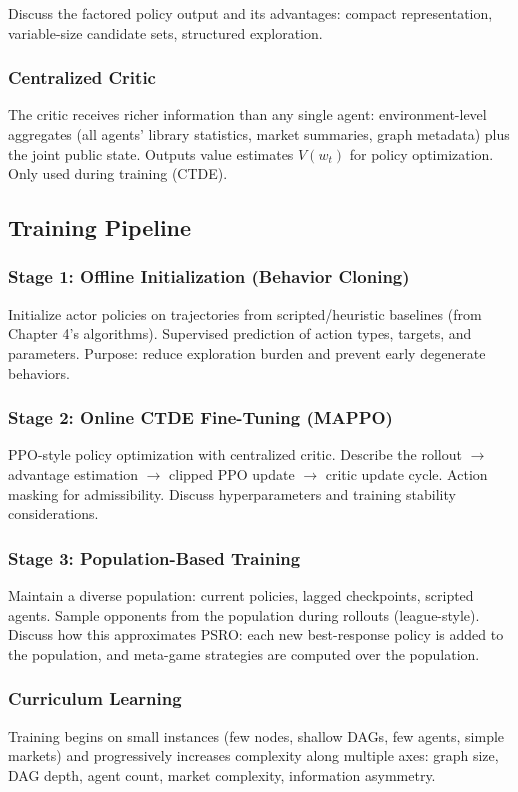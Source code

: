 Discuss the factored policy output and its advantages: compact representation, variable-size candidate sets, structured exploration.

\subsubsection{Centralized Critic}
The critic receives richer information than any single agent: environment-level aggregates (all agents' library statistics, market summaries, graph metadata) plus the joint public state. Outputs value estimates $V(w_t)$ for policy optimization. Only used during training (CTDE).

\subsection{Training Pipeline}

\subsubsection{Stage 1: Offline Initialization (Behavior Cloning)}
Initialize actor policies on trajectories from scripted/heuristic baselines (from Chapter 4's algorithms). Supervised prediction of action types, targets, and parameters. Purpose: reduce exploration burden and prevent early degenerate behaviors.

\subsubsection{Stage 2: Online CTDE Fine-Tuning (MAPPO)}
PPO-style policy optimization with centralized critic. Describe the rollout $\to$ advantage estimation $\to$ clipped PPO update $\to$ critic update cycle. Action masking for admissibility. Discuss hyperparameters and training stability considerations.

\subsubsection{Stage 3: Population-Based Training}
Maintain a diverse population: current policies, lagged checkpoints, scripted agents. Sample opponents from the population during rollouts (league-style). Discuss how this approximates PSRO: each new best-response policy is added to the population, and meta-game strategies are computed over the population.

\subsubsection{Curriculum Learning}
Training begins on small instances (few nodes, shallow DAGs, few agents, simple markets) and progressively increases complexity along multiple axes: graph size, DAG depth, agent count, market complexity, information asymmetry.

